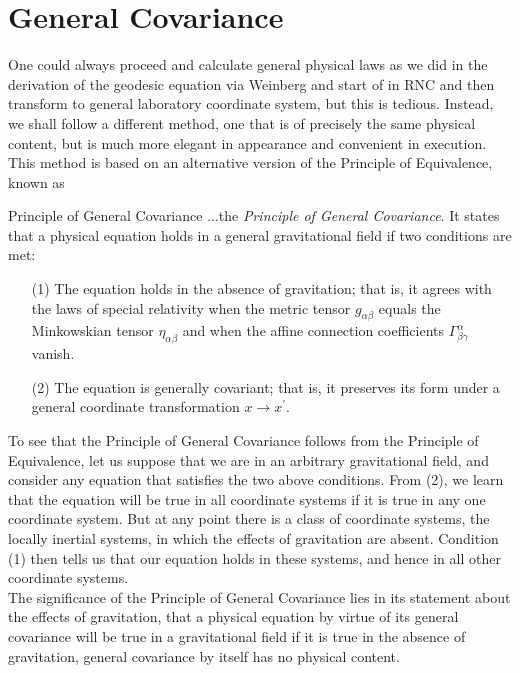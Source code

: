 \section{General Covariance}
\label{sec:generalcovariance}
One could always proceed and calculate general physical laws as we did in the derivation of the geodesic equation via Weinberg and start of in RNC and then transform to general laboratory coordinate system, but this is tedious. Instead, we shall follow a different method, one that is of precisely the same physical content, but is much more elegant in appearance and convenient in execution. This method is based on an alternative version of the Principle of Equivalence, known as
\begin{mybox}{Principle of General Covariance}
	...the \emph{Principle of General Covariance}. It states that a physical equation holds in a general gravitational field if two conditions are met:
	\begin{enumerate}
		\item[(1)] The equation holds in the absence of gravitation; that is, it agrees with the laws of special relativity when the metric tensor $g_{\alpha \beta}$ equals the Minkowskian tensor $\eta_{\alpha \beta}$ and when the affine connection coefficients $\Gamma^\alpha_{\beta \gamma}$ vanish.
		\item[(2)] The equation is generally covariant; that is, it preserves its form under a general coordinate transformation $x\rightarrow x^\prime$.
	\end{enumerate}
\end{mybox}
To see that the Principle of General Covariance follows from the Principle of Equivalence, let us suppose that we are in an arbitrary gravitational field, and consider any equation that satisfies the two above conditions. From (2), we learn that the equation will be true in all coordinate systems if it is true in any one coordinate system. But at any point there is a class of coordinate systems, the locally inertial systems, in which the effects of gravitation are absent. Condition (1) then tells us that our equation holds in these systems, and hence in all other coordinate systems.\\
The significance of the Principle of General Covariance lies in its statement about the effects of gravitation, that a physical equation by virtue of its general covariance will be true in a gravitational field if it is true in the absence of gravitation, general covariance by itself has no physical content.
